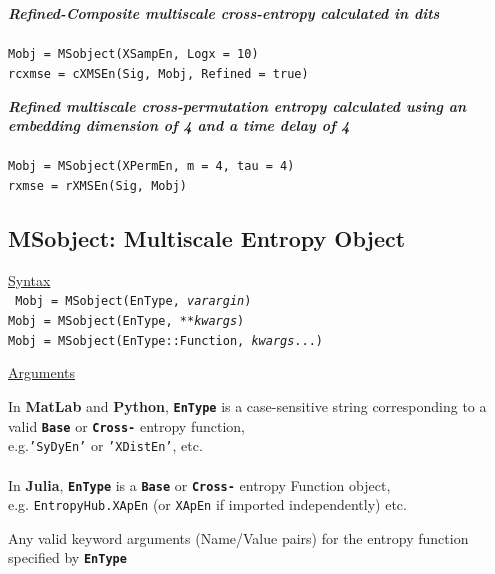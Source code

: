 \documentclass[12pt, a4paper, titlepage, openany]{book}
\begin{document}
\noindent \emph{\textbf{Refined-Composite multiscale cross-entropy calculated in dits}} \cite{cMS2}
\\ \ \\ \indent \texttt{Mobj = MSobject(XSampEn, Logx = 10)\\
\indent rcxmse = cXMSEn(Sig, Mobj, Refined = true)}

\noindent \emph{\textbf{Refined multiscale cross-permutation entropy calculated using an embedding dimension of 4 and a time delay of 4}}
\\ \ \\ \indent \texttt{Mobj = MSobject(XPermEn, m = 4, tau = 4)\\
\indent rxmse = rXMSEn(Sig, Mobj)}




\newpage
\subsection{\normalsize MSobject: \hspace{15mm} Multiscale Entropy Object}
\noindent\ul{Syntax} \vspace{6mm} \\ \noindent \texttt{\footnotesize
Mobj = MSobject(EnType, \textit{varargin})\\
Mobj = MSobject(EnType, \textit{**kwargs})\\ 
Mobj = MSobject(EnType::Function, \textit{kwargs}...)}

\noindent \ul{Arguments}
\begin{description}[labelsep=2cm, labelwidth=5cm, nosep, style=multiline,leftmargin=4cm]\footnotesize
\item[\texttt{EnType}]		In \textbf{MatLab} and \textbf{Python}, \texttt{\textbf{EnType}} is a case-sensitive 							string corresponding to a valid \texttt{\textbf{Base}} or  \texttt{\textbf{Cross-}} entropy 							function, \\	e.g.\texttt{'SyDyEn'} or \texttt{'XDistEn'}, etc.\\ \ \\
							In \textbf{Julia}, \texttt{\textbf{EnType}} is a \texttt{\textbf{Base}} or  									\texttt{\textbf{Cross-}} entropy Function object,\\ e.g. \texttt{EntropyHub.XApEn} (or 									\texttt{XApEn} if imported independently) etc.\\
\item[\texttt{varargin\\ **kwargs\\kwargs...}] 		Any valid keyword arguments (Name/Value pairs) for the entropy function specified by \texttt{\textbf{EnType}}\\
\end{description}
\end{document}

